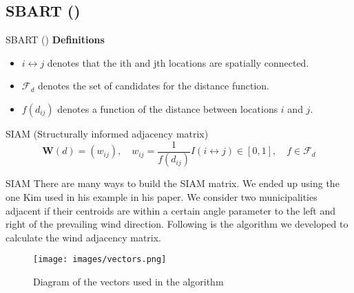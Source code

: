 \documentclass[10pt]{beamer}
\begin{document}
\subsection{SBART (\cite{Kim_2022})}

\begin{frame}{SBART (\cite{Kim_2022})}
    \textbf{Definitions}
    \begin{itemize}
        \item $i \leftrightarrow j$ denotes that the ith and jth locations are spatially connected.
        \item $\mathcal{F}_d$ denotes the set of candidates for the distance function.
        \item $f(d_{ij})$ denotes a function of the distance between locations $i$ and $j$.
    \end{itemize}
    
    \begin{block}{SIAM (Structurally informed adjacency matrix)}
        \begin{equation}
            \textbf{W}(d) = (w_{ij}), \quad w_{ij} = \frac{1}{f(d_{ij})}I(i \leftrightarrow j) \in [0,1], \quad f \in \mathcal{F}_d
        \end{equation}
    \end{block}
\end{frame}

\begin{frame}{SIAM}
    There are many ways to build the SIAM matrix. We ended up using the one Kim used in his example in his paper.
    We consider two municipalities adjacent if their centroids are within a certain angle parameter to the left and right of the prevailing wind direction. Following is the algorithm we developed to calculate the wind adjacency matrix.
    \begin{figure}[H]
    \centering
    \texttt{[image: images/vectors.png]}
    \caption{Diagram of the vectors used in the algorithm}
    \label{fig:vectors}
\end{figure}
\end{frame}
\end{document}
